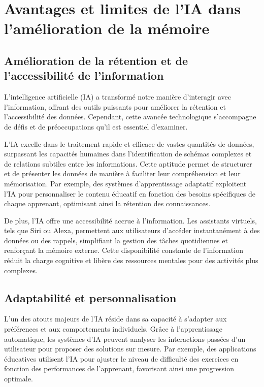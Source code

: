 \documentclass[12pt,a4paper]{report}
\begin{document}
\section{Avantages et limites de l'IA dans l'amélioration de la mémoire}

\subsection{Amélioration de la rétention et de l'accessibilité de l'information}

L'intelligence artificielle (IA) a transformé notre manière d'interagir avec l'information, offrant des outils puissants pour améliorer la rétention et l'accessibilité des données. Cependant, cette avancée technologique s'accompagne de défis et de préoccupations qu'il est essentiel d'examiner.

L'IA excelle dans le traitement rapide et efficace de vastes quantités de données, surpassant les capacités humaines dans l'identification de schémas complexes et de relations subtiles entre les informations. Cette aptitude permet de structurer et de présenter les données de manière à faciliter leur compréhension et leur mémorisation. Par exemple, des systèmes d'apprentissage adaptatif exploitent l'IA pour personnaliser le contenu éducatif en fonction des besoins spécifiques de chaque apprenant, optimisant ainsi la rétention des connaissances.

De plus, l'IA offre une accessibilité accrue à l'information. Les assistants virtuels, tels que Siri ou Alexa, permettent aux utilisateurs d'accéder instantanément à des données ou des rappels, simplifiant la gestion des tâches quotidiennes et renforçant la mémoire externe. Cette disponibilité constante de l'information réduit la charge cognitive et libère des ressources mentales pour des activités plus complexes.

\subsection{Adaptabilité et personnalisation}

L'un des atouts majeurs de l'IA réside dans sa capacité à s'adapter aux préférences et aux comportements individuels. Grâce à l'apprentissage automatique, les systèmes d'IA peuvent analyser les interactions passées d'un utilisateur pour proposer des solutions sur mesure. Par exemple, des applications éducatives utilisent l'IA pour ajuster le niveau de difficulté des exercices en fonction des performances de l'apprenant, favorisant ainsi une progression optimale.
\end{document}
